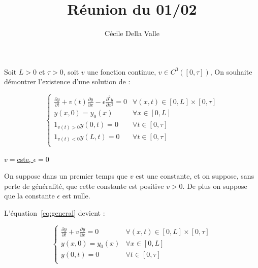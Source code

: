 \documentclass[a4paper]{article}
\title{Réunion du 01/02}
\author{Cécile Della Valle}
\begin{document}
\maketitle


Soit $L>0$ et $\tau>0$,
soit $v$ une fonction continue, $v \in C^0([0,\tau])$, 
On souhaite démontrer l'existence d'une solution de :

\begin{equation}
\label{eq:general}
\begin{cases}
 \displaystyle \frac{\partial y}{\partial t}
 + v(t) \frac{\partial y} {\partial x}  
 - \epsilon \frac{\partial^2 y} {\partial x^2}
 = 0  & \forall (x,t) \in [0,L] \times [0, \tau]\\
 y(x,0) = y_{0} (x) & \forall x \in [0,L] \\
 1_{v(t)>0}y(0,t) = 0 & \forall t \in [0,\tau] \\
 1_{v(t)<0}y(L,t) = 0 & \forall t \in [0,\tau] \\
\end{cases}
\end{equation}


\vspace{0.5cm}

\underline{$v=$cste, $\epsilon = 0$}

On suppose dans un premier temps que $v$ est une constante, et on suppose,
sans perte de généralité, 
que cette constante est positive $v>0$.
De plus on suppose que la constante $\epsilon$ est nulle.

L'équation~\eqref{eq:general} devient :

\begin{equation}
\label{eq:cas0}
\begin{cases}
 \displaystyle \frac{\partial y}{\partial t}
 + v \frac{\partial y} {\partial x}  
 = 0  & \forall (x,t) \in [0,L] \times [0, \tau]\\
 y(x,0) = y_{0} (x) & \forall x \in [0,L] \\
 y(0,t) = 0 & \forall t \in [0,\tau] \\
\end{cases}
\end{equation}
\end{document}
